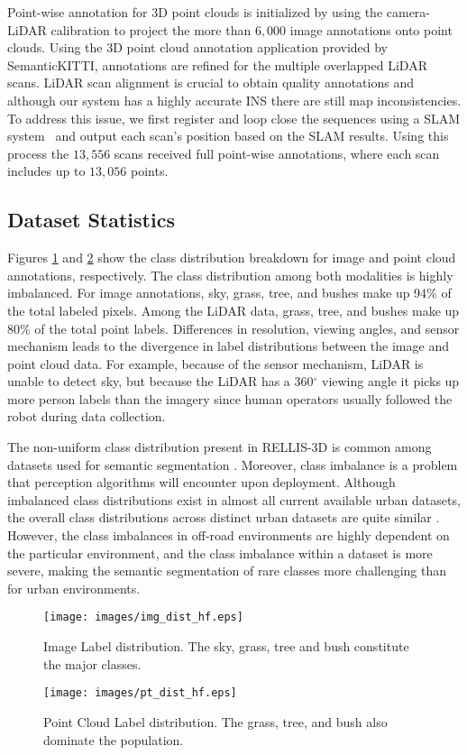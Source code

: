 \documentclass[letterpaper, 10 pt, conference]{ieeeconf}
\begin{document}
Point-wise annotation for 3D point clouds is initialized by using the camera-LiDAR calibration to project the more than $6,000$ image annotations onto point clouds. Using the 3D point cloud annotation application provided by SemanticKITTI\cite{behley2019iccv}, annotations are refined for the multiple overlapped LiDAR scans. LiDAR scan alignment is crucial to obtain quality annotations and although our system has a highly accurate INS there are still map inconsistencies. To address this issue, we first register and loop close the sequences using a SLAM system~\cite{ Maturana2015} and output each scan's position based on the SLAM results. Using this process the $13,556$ scans received full point-wise annotations, where each scan includes up to $13,056$ points.
\subsection{Dataset Statistics}
Figures \ref{fig:img_dist} and \ref{fig:pt_dist} show the class distribution breakdown for image and point cloud annotations, respectively. The class distribution among both modalities is highly imbalanced. For image annotations, sky, grass, tree, and bushes make up 94\% of the total labeled pixels. Among the LiDAR data, grass, tree, and bushes make up 80\% of the total point labels. Differences in resolution, viewing angles, and sensor mechanism leads to the divergence in label distributions between the image and point cloud data. For example, because of the sensor mechanism, LiDAR is unable to detect sky, but because the LiDAR has a 360$^{\circ}$ viewing angle it picks up more person labels than the imagery since human operators usually followed the robot during data collection.

The non-uniform class distribution present in RELLIS-3D is common among datasets used for semantic segmentation \cite{Feng2020, Neuhold2017, behley2019iccv}. Moreover, class imbalance is a problem that perception algorithms will encounter upon deployment.
Although imbalanced class distributions exist in almost all current available urban datasets, the overall class distributions across distinct urban datasets are quite similar \cite{behley2019iccv, Neuhold2017}. However, the class imbalances in off-road environments are highly dependent on the particular environment, and the class imbalance within a dataset is more severe, making the semantic segmentation of rare classes more challenging than for urban environments. 
\begin{figure}
  \centering
  \texttt{[image: images/img\_dist\_hf.eps]}
  \caption{Image Label distribution. The sky, grass, tree and bush constitute the major classes.}
  \label{fig:img_dist}
\end{figure} \begin{figure}
  \centering
  \texttt{[image: images/pt\_dist\_hf.eps]}
  \caption{Point Cloud Label distribution. The grass, tree, and bush also dominate the population.}
  \label{fig:pt_dist}
\end{figure} %
\end{document}
